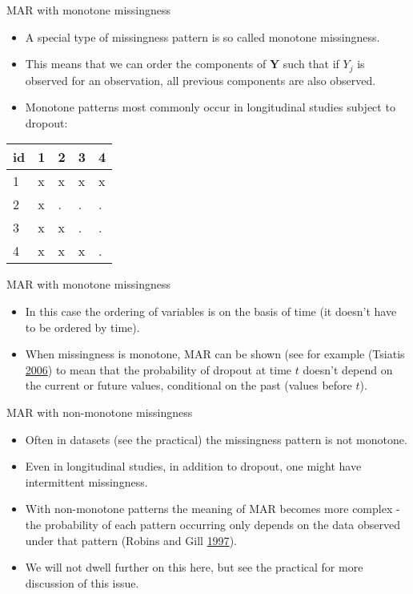 \documentclass[ignorenonframetext,]{beamer}
\providecommand{\tightlist}{%
  \setlength{\itemsep}{0pt}\setlength{\parskip}{0pt}}
\begin{document}
\begin{frame}{MAR with monotone missingness}
\protect\hypertarget{mar-with-monotone-missingness}{}

\begin{itemize}
\tightlist
\item
  A special type of missingness pattern is so called monotone
  missingness.
\item
  This means that we can order the components of \(\mathbf Y\) such that
  if \(Y_{j}\) is observed for an observation, all previous components
  are also observed.
\item
  Monotone patterns most commonly occur in longitudinal studies subject
  to dropout:
\end{itemize}

\begin{longtable}[]{@{}lllll@{}}
\toprule
id & 1 & 2 & 3 & 4\tabularnewline
\midrule
\endhead
1 & x & x & x & x\tabularnewline
2 & x & . & . & .\tabularnewline
3 & x & x & . & .\tabularnewline
4 & x & x & x & .\tabularnewline
\bottomrule
\end{longtable}

\end{frame}

\begin{frame}{MAR with monotone missingness}
\protect\hypertarget{mar-with-monotone-missingness-1}{}

\begin{itemize}
\tightlist
\item
  In this case the ordering of variables is on the basis of time (it
  doesn't have to be ordered by time).
\item
  When missingness is monotone, MAR can be shown (see for example
  (Tsiatis \protect\hyperlink{ref-Tsiatis:2006}{2006}) to mean that the
  probability of dropout at time \(t\) doesn't depend on the current or
  future values, conditional on the past (values before \(t\)).
\end{itemize}

\end{frame}

\begin{frame}{MAR with non-monotone missingness}
\protect\hypertarget{mar-with-non-monotone-missingness}{}

\begin{itemize}
\tightlist
\item
  Often in datasets (see the practical) the missingness pattern is not
  monotone.
\item
  Even in longitudinal studies, in addition to dropout, one might have
  intermittent missingness.
\item
  With non-monotone patterns the meaning of MAR becomes more complex -
  the probability of each pattern occurring only depends on the data
  observed under that pattern (Robins and Gill
  \protect\hyperlink{ref-Robins1997}{1997}).
\item
  We will not dwell further on this here, but see the practical for more
  discussion of this issue.
\end{itemize}

\end{frame}
\end{document}
